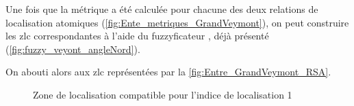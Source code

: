 Une fois que la métrique a été calculée pour chacune des deux
relations de localisation atomiques
(\autoref{fig:Ente_metriques_GrandVeymont}), on peut construire les
\ac{zlc} correspondantes à l'aide du fuzzyficateur
, déjà présenté
(\autoref{fig:fuzzy_veyont_angleNord}).

On abouti alors aux \ac{zlc} représentées par la
\autoref{fig:Entre_GrandVeymont_RSA}.


\begin{figure}
  \centering
  \hspace{1cm}
  \caption{Zone de localisation compatible pour l'indice de
    localisation 1}
  \label{fig:Entre_GrandVeymont_RSA}
\end{figure}



